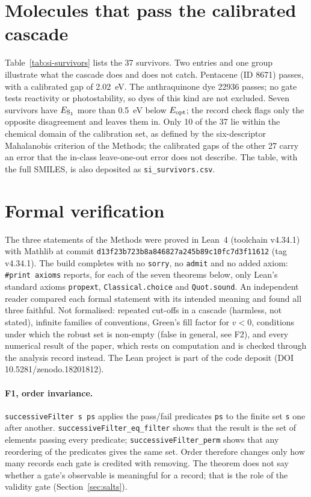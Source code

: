\documentclass[11pt]{article}
\begin{document}
\section{Molecules that pass the calibrated cascade}
Table~\ref{tab:si-survivors} lists the 37 survivors. Two entries and one group illustrate what the cascade does and does
not catch. Pentacene (ID 8671) passes, with a calibrated gap of \qty{2.02}{eV}. The anthraquinone dye 22936 passes; no
gate tests reactivity or photostability, so dyes of this kind are not excluded. Seven survivors have
$E_{\mathrm{S_1}}$ more than \qty{0.5}{eV} below $E_{\mathrm{opt}}$; the record check flags only the opposite disagreement and leaves them in.
Only 10 of the 37 lie within the chemical domain of the calibration set, as defined by the six-descriptor Mahalanobis
criterion of the Methods; the calibrated gaps of the other 27 carry an
error that the in-class leave-one-out error does not describe. The table, with the full SMILES, is also deposited as
\texttt{si\_survivors.csv}.


\section{Formal verification}
The three statements of the Methods were proved in Lean~4 (toolchain v4.34.1) with Mathlib at commit
\texttt{d13f23b723b8a846827a245b89c10fc7d3f11612} (tag v4.34.1). The build completes with no \texttt{sorry}, no
\texttt{admit} and no added axiom: \texttt{\#print axioms} reports, for each of the seven theorems below, only Lean's
standard axioms \texttt{propext}, \texttt{Classical.choice} and \texttt{Quot.sound}. An independent reader compared each
formal statement with its intended meaning and found all three faithful. Not formalised: repeated cut-offs in a cascade
(harmless, not stated), infinite families of conventions, Green's fill factor for $v < 0$, conditions under which the
robust set is non-empty (false in general, see F2), and every numerical result of the paper, which rests on computation
and is checked through the analysis record instead. The Lean project is part of the code deposit
(DOI 10.5281/zenodo.18201812).

\paragraph{F1, order invariance.} \texttt{successiveFilter s ps} applies the pass/fail predicates \texttt{ps} to the
finite set \texttt{s} one after another. \texttt{successiveFilter\_eq\_filter} shows that the result is the set of
elements passing every predicate; \texttt{successiveFilter\_perm} shows that any reordering of the predicates gives the
same set. Order therefore changes only how many records each gate is credited with removing. The theorem does not
say whether a gate's observable is meaningful for a record; that is the role of the validity gate
(Section~\ref{sec:salts}).
\end{document}
